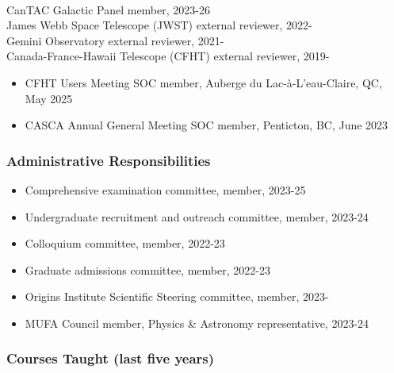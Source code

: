 \documentclass[12pt]{article}
\begin{document}
\\
CanTAC Galactic Panel member, 2023-26\\
James Webb Space Telescope (JWST) external reviewer, 2022-\\
Gemini Observatory external reviewer, 2021-\\
Canada-France-Hawaii Telescope (CFHT) external reviewer, 2019-\\


\begin{itemize}[noitemsep]
\item CFHT Users Meeting SOC member, Auberge du Lac-\`a-L'eau-Claire, QC, May 2025
\item CASCA Annual General Meeting SOC member, Penticton, BC, June 2023
\end{itemize}


\subsubsection*{Administrative Responsibilities}

\begin{itemize}[noitemsep]
\item Comprehensive examination committee, member, 2023-25
\item Undergraduate recruitment and outreach committee, member, 2023-24
\item Colloquium committee, member, 2022-23
\item Graduate admissions committee, member, 2022-23
\end{itemize}

\begin{itemize}
\item Origins Institute Scientific Steering committee, member, 2023-
\end{itemize}

\begin{itemize}
\item MUFA Council member, Physics \& Astronomy representative, 2023-24
\end{itemize}


\subsubsection*{Courses Taught (last five years)}
\end{document}
